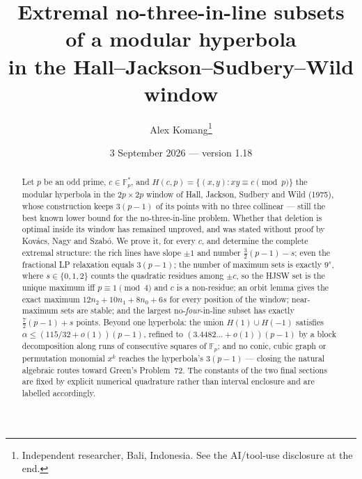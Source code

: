 \documentclass[11pt]{article}
\title{Extremal no-three-in-line subsets of a modular hyperbola\\ in the Hall--Jackson--Sudbery--Wild window}
\author{Alex Komang\thanks{Independent researcher, Bali, Indonesia.  See the AI/tool-use disclosure at the end.}}
\date{3 September 2026 --- version 1.18}
\theoremstyle{remark}
\newcommand{\Fp}{\mathbb{F}_p}
\newcommand{\Hc}{H(c,p)}
\begin{document}
\maketitle

\begin{abstract}
Let $p$ be an odd prime, $c\in\Fp^*$, and $\Hc=\{(x,y):xy\equiv c\pmod p\}$ the modular hyperbola in the
$2p\times2p$ window of Hall, Jackson, Sudbery and Wild (1975), whose construction keeps $3(p-1)$ of its points
with no three collinear --- still the best known lower bound for the no-three-in-line problem.  Whether that
deletion is optimal inside its window has remained unproved, and was stated without proof by Kov\'acs, Nagy and
Szab\'o.  We prove it, for every $c$, and determine the complete extremal structure: the rich lines have slope
$\pm1$ and number $\tfrac32(p-1)-s$; even the fractional LP relaxation equals $3(p-1)$; the number of maximum
sets is exactly $9^s$, where $s\in\{0,1,2\}$ counts the quadratic residues among $\pm c$, so the HJSW set is the
unique maximum iff $p\equiv1\pmod4$ and $c$ is a non-residue; an orbit lemma gives the exact maximum
$12n_2+10n_1+8n_0+6s$ for every position of the window; near-maximum sets are stable; and the largest
no-\emph{four}-in-line subset has exactly $\tfrac72(p-1)+s$ points.  Beyond one hyperbola: the union
$H(1)\cup H(-1)$ satisfies $\alpha\le(115/32+o(1))(p-1)$, refined to $(3.4482\ldots+o(1))(p-1)$ by a block
decomposition along runs of consecutive squares of $\Fp$; and no conic, cubic graph or permutation monomial
$x^k$ reaches the hyperbola's $3(p-1)$ --- closing the natural algebraic routes toward Green's Problem~72.
The constants of the two final sections are fixed by explicit numerical quadrature rather than interval
enclosure and are labelled accordingly.
\end{abstract}
\end{document}
